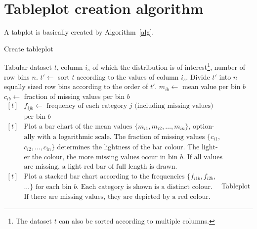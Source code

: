 \documentclass[11pt, fleqn, a4paper]{article}\usepackage{graphicx, color}
\begin{document}
\appendix
\newpage
\section{Tableplot creation algorithm}\label{secalg}
A tabplot is basically created by Algorithm~\ref{alg}.

\begin{algorithm}[h]
\caption{Create tableplot}\label{alg}
\begin{minipage}{0.8\textwidth}
\begin{algorithmic}[1]
\Require Tabular dataset $t$, column $i_s$ of which the distribution is of interest\footnote{The dataset $t$ can also be sorted according to multiple columns.}, number of row bins $n$.
\State $t'\leftarrow$ sort $t$ according to the values of column $i_s$.
\State Divide $t'$ into $n$ equally sized row bins according to the order of $t'$.
\State $m_{ib}\leftarrow$ mean value per bin $b$
\State $c_{ib}\leftarrow$ fraction of missing values per bin $b$
\EndIf
{}
\State $\begin{aligned}[t]
		&\mbox{$f_{ijb}\leftarrow$ frequency of each category $j$ (including missing values)}\\[-3pt]
		&\mbox{per bin $b$}
	\end{aligned}$
\EndIf
\EndFor
{}
\State $\begin{aligned}[t]
		&\mbox{Plot a bar chart of the mean values $\{m_{i1}, m_{i2},\ldots, m_{in}\}$, option-}\\[-3pt]
		&\mbox{ally with a logarithmic scale. The fraction of missing values $\{c_{i1},$}\\[-3pt]
		&\mbox{$c_{i2},\ldots, c_{in}\}$ determines the lightness of the bar colour. The light-}\\[-3pt]
		&\mbox{er the colour, the more missing values occur in bin $b$. If all values}\\[-3pt]
		&\mbox{are missing, a light red bar of full length is drawn.}
	\end{aligned}$
\EndIf
{}
\State $\begin{aligned}[t]
		&\mbox{Plot a stacked bar chart according to the frequencies $\{f_{i1b}, f_{i2b},$}\\[-3pt]
		&\mbox{$\ldots\}$ for each bin $b$. Each category is shown is a distinct colour.}\\[-3pt]
		&\mbox{If there are missing values, they are depicted by a red colour.}
	\end{aligned}$
\EndIf
\EndFor
\Ensure Tableplot
\end{algorithmic}
\end{minipage}
\end{algorithm}
\end{document}
